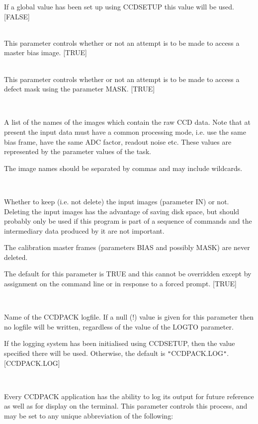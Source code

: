 \documentclass[twoside,11pt]{article}
\newcommand{\htmlref}[2]{#1}
\renewcommand{\_}{\texttt{\symbol{95}}}
\newcommand{\qt}[1]{{\tt "}#1{\tt "}}
\newcommand{\xroutine}[1]{\htmlref{{\sc #1}}{#1}}
\newcommand{\sstsubsection}[1]{ \item[{#1}] \mbox{} \\}
\newcommand{\sstitemlist}[1]{
  \mbox{} \\
  \vspace{-3.5ex}
  \begin{itemize}
     #1
  \end{itemize}
}
\newcommand{\sstsubsection}[1]{\item[{#1}]}
\newcommand{\sstitemlist}[1]{
      \begin{itemize}
         #1
      \end{itemize}
      \\
   }
\begin{document}
{{{         If a global value has been set up using \xroutine{CCDSETUP} this value
         will be used.
         [FALSE]
      }
      \sstsubsection{
         GETBIAS = \_LOGICAL (Read)
      } {
         This parameter controls whether or not an attempt is to be made
         to access a master bias image.
         [TRUE]
      }
      \sstsubsection{
         GETMASK = \_LOGICAL (Read)
      } {
         This parameter controls whether or not an attempt is to be made
         to access a defect mask using the parameter MASK.
         [TRUE]
      }
      \sstsubsection{
         IN = LITERAL (Read)
      } {
         A list of the names of the images which contain the raw CCD
         data. Note that at present the input data must have a common
         processing mode, i.e. use the same bias frame, have the same
         ADC factor, readout noise etc. These values are represented
         by the parameter values of the task.

         The image names should be separated by commas and may include
         wildcards.
      }
      \sstsubsection{
         KEEPIN = \_LOGICAL (Read)
      } {
         Whether to keep (i.e. not delete) the input images (parameter IN)
         or not. Deleting the input images has the advantage of saving
         disk space, but should probably only be used if this program
         is part of a sequence of commands and the intermediary data
         produced by it are not important.

         The calibration master frames (parameters BIAS and possibly MASK)
         are never deleted.

         The default for this parameter is TRUE and this cannot be
         overridden except by assignment on the command line or in
         response to a forced prompt.
         [TRUE]
      }
      \sstsubsection{
         LOGFILE = FILENAME (Read)
      } {
         Name of the CCDPACK logfile.  If a null (!) value is given for
         this parameter then no logfile will be written, regardless of
         the value of the LOGTO parameter.

         If the logging system has been initialised using \xroutine{CCDSETUP},
         then the value specified there will be used. Otherwise, the
         default is \qt{CCDPACK.LOG}.
         [CCDPACK.LOG]
      }
      \sstsubsection{
         LOGTO = LITERAL (Read)
      } {
         Every CCDPACK application has the ability to log its output
         for future reference as well as for display on the terminal.
         This parameter controls this process, and may be set to any
         unique abbreviation of the following:
         \sstitemlist{

}}}}
\end{document}
